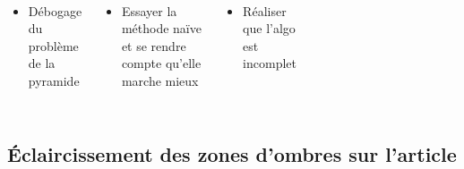 \begin{frame}[fragile=singleslide]{\insertsectionhead}
  \framesubtitle{\insertsubsectionhead}
  \begin{columns}[T,onlytextwidth]
      \begin{itemize}
        \item Débogage du problème de la pyramide
      \end{itemize}
      \hfill
      \begin{itemize}
        \item Essayer la méthode naïve et se rendre compte qu'elle marche mieux
      \end{itemize}
      \hfill
      \begin{itemize}
        \item Réaliser que l'algo est incomplet
      \end{itemize}
    \begin{figure}
        \begin{subfigure}{0.6\textwidth}
        \end{subfigure}
      \end{figure}
  \end{columns}
\end{frame}

\subsection{Éclaircissement des zones d'ombres sur l'article}

